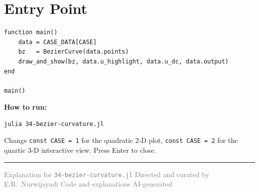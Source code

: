 \documentclass[12pt, a4paper]{article}
\newcommand{\cd}[1]{\texttt{#1}}
\begin{document}
\section{Entry Point}

\begin{verbatim}
function main()
    data = CASE_DATA[CASE]
    bz   = BezierCurve(data.points)
    draw_and_show(bz, data.u_highlight, data.u_dc, data.output)
end

main()
\end{verbatim}

\begin{notebox}
\textbf{How to run:}
\begin{verbatim}
julia 34-bezier-curvature.jl
\end{verbatim}
Change \cd{const CASE = 1} for the quadratic 2-D plot,
\cd{const CASE = 2} for the quartic 3-D interactive view.
Press Enter to close.
\end{notebox}

\vspace{2em}\hrule\vspace{0.5em}
{\small\textcolor{gray}{%
Explanation for \texttt{34-bezier-curvature.jl}
\textbar{} Directed and curated by E.R.\ Nurwijayadi
\textbar{} Code and explanations AI-generated}}
\end{document}
